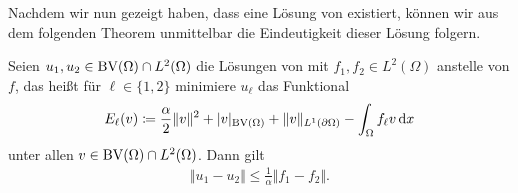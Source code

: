 Nachdem wir nun gezeigt haben, dass eine Lösung von
 existiert, können wir aus dem folgenden
Theorem unmittelbar die Eindeutigkeit dieser Lösung folgern. 

\begin{theorem}[Stabilität]
  \label{thm:contProbStabAndUniqu}
  Seien $u_1,u_2\in \textup{BV}(\Omega)\cap L^2(\Omega)$ die Lösungen von
   mit $f_1,f_2\in L^2(\Omega)$ anstelle von $f$,
  das heißt für $\ell\in\{1,2\}$ minimiere $u_\ell$ das Funktional
  \begin{align*}
    E_\ell(v)
    \coloneqq 
    \frac{\alpha}{2}\Vert v\Vert^2 + |v|_{\textup{BV}(\Omega)} 
    + \Vert v\Vert_{L^1(\partial\Omega)} - \int_\Omega f_\ell v\,\mathrm{d}x
  \end{align*}
  unter allen $v\in\textup{BV}(\Omega)\cap L^2(\Omega)$.
  Dann gilt 
  \begin{align*}
    \Vert u_1 - u_2\Vert 
    \leq\frac{1}{\alpha}\Vert f_1-f_2\Vert.
  \end{align*}
\end{theorem}


